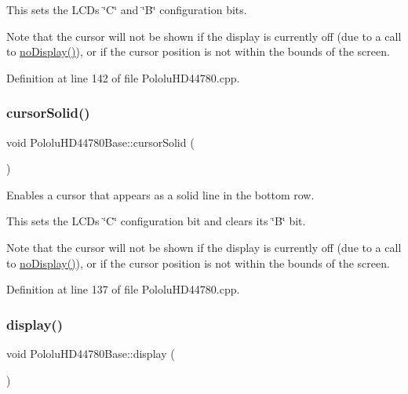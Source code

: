 This sets the L\+CD\textquotesingle{}s \char`\"{}\+C\char`\"{} and \char`\"{}\+B\char`\"{} configuration bits.

Note that the cursor will not be shown if the display is currently off (due to a call to \hyperlink{class_pololu_h_d44780_base_abc2d4e126017565c2a0cf2aac67870a0}{no\+Display()}), or if the cursor position is not within the bounds of the screen. 

Definition at line 142 of file Pololu\+H\+D44780.\+cpp.

\mbox{\label{class_pololu_h_d44780_base_a6a4d8e79beda9f7c81659a8e13c8c338}} 
\subsubsection{\texorpdfstring{cursor\+Solid()}{cursorSolid()}}
{\footnotesize\ttfamily void Pololu\+H\+D44780\+Base\+::cursor\+Solid (\begin{DoxyParamCaption}{ }\end{DoxyParamCaption})\hspace{0.3cm}{\ttfamily [inherited]}}

Enables a cursor that appears as a solid line in the bottom row.

This sets the L\+CD\textquotesingle{}s \char`\"{}\+C\char`\"{} configuration bit and clears its \char`\"{}\+B\char`\"{} bit.

Note that the cursor will not be shown if the display is currently off (due to a call to \hyperlink{class_pololu_h_d44780_base_abc2d4e126017565c2a0cf2aac67870a0}{no\+Display()}), or if the cursor position is not within the bounds of the screen. 

Definition at line 137 of file Pololu\+H\+D44780.\+cpp.

\mbox{\label{class_pololu_h_d44780_base_af5dd1e137bfe9310a418924b7483fcdf}} 
\subsubsection{\texorpdfstring{display()}{display()}}
{\footnotesize\ttfamily void Pololu\+H\+D44780\+Base\+::display (\begin{DoxyParamCaption}{ }\end{DoxyParamCaption})\hspace{0.3cm}{\ttfamily [inherited]}}


